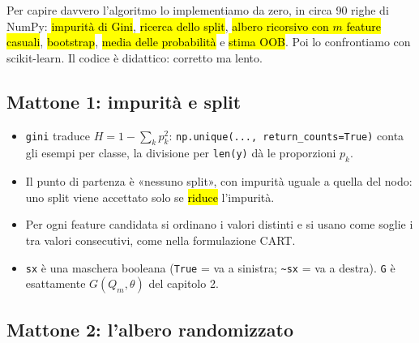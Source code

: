 
\begin{inbreve}
Per capire davvero l'algoritmo lo implementiamo da zero, in circa 90 righe di NumPy: \hl{impurità di Gini}, \hl{ricerca dello split}, \hl{albero ricorsivo con $m$ feature casuali}, \hl{bootstrap}, \hl{media delle probabilità} e \hl{stima OOB}. Poi lo confrontiamo con scikit-learn. Il codice è didattico: corretto ma lento.
\end{inbreve}

\subsection{Mattone 1: impurità e split}


\begin{tecnica}[Spiegazione]
\begin{itemize}
  \item {} \texttt{gini} traduce $H=1-\sum_k p_k^2$: \texttt{np.unique(..., return\_counts=True)} conta gli esempi per classe, la divisione per \texttt{len(y)} dà le proporzioni $p_k$.
  \item {} Il punto di partenza è «nessuno split», con impurità uguale a quella del nodo: uno split viene accettato solo se \hl{riduce} l'impurità.
  \item {} Per ogni feature candidata si ordinano i valori distinti e si usano come soglie i  tra valori consecutivi, come nella formulazione CART.
  \item {} \texttt{sx} è una maschera booleana (\texttt{True} = va a sinistra; \texttt{\textasciitilde sx} = va a destra). \texttt{G} è esattamente $G(Q_m,\theta)$ del capitolo 2.
\end{itemize}
\end{tecnica}

\subsection{Mattone 2: l'albero randomizzato}


